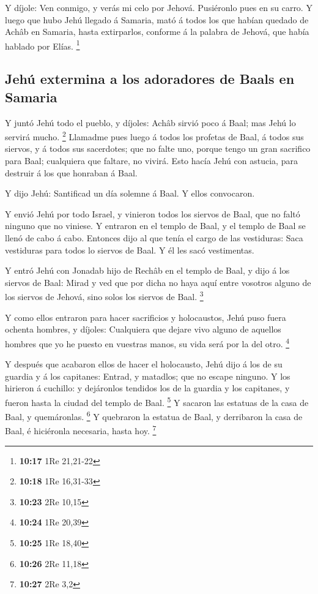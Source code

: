  Y díjole: Ven conmigo, y verás mi celo por Jehová.
Pusiéronlo pues en su carro.  Y luego que hubo Jehú llegado
á Samaria, mató á todos los que habían quedado de Achâb en Samaria,
hasta extirparlos, conforme á la palabra de Jehová, que había hablado
por Elías. \footnote{\textbf{10:17} 1Re 21,21-22}

\hypertarget{jehuxfa-extermina-a-los-adoradores-de-baals-en-samaria}{%
\subsection{Jehú extermina a los adoradores de Baals en
Samaria}\label{jehuxfa-extermina-a-los-adoradores-de-baals-en-samaria}}

 Y juntó Jehú todo el pueblo, y díjoles: Achâb sirvió poco
á Baal; mas Jehú lo servirá mucho. \footnote{\textbf{10:18} 1Re 16,31-33}
 Llamadme pues luego á todos los profetas de Baal, á todos
sus siervos, y á todos sus sacerdotes; que no falte uno, porque tengo un
gran sacrifico para Baal; cualquiera que faltare, no vivirá. Esto hacía
Jehú con astucia, para destruir á los que honraban á Baal.

 Y dijo Jehú: Santificad un día solemne á Baal. Y ellos
convocaron.

 Y envió Jehú por todo Israel, y vinieron todos los siervos
de Baal, que no faltó ninguno que no viniese. Y entraron en el templo de
Baal, y el templo de Baal se llenó de cabo á cabo. 
Entonces dijo al que tenía el cargo de las vestiduras: Saca vestiduras
para todos lo siervos de Baal. Y él les sacó vestimentas.

 Y entró Jehú con Jonadab hijo de Rechâb en el templo de
Baal, y dijo á los siervos de Baal: Mirad y ved que por dicha no haya
aquí entre vosotros alguno de los siervos de Jehová, sino solos los
siervos de Baal. \footnote{\textbf{10:23} 2Re 10,15}

 Y como ellos entraron para hacer sacrificios y
holocaustos, Jehú puso fuera ochenta hombres, y díjoles: Cualquiera que
dejare vivo alguno de aquellos hombres que yo he puesto en vuestras
manos, su vida será por la del otro. \footnote{\textbf{10:24} 1Re 20,39}

 Y después que acabaron ellos de hacer el holocausto, Jehú
dijo á los de su guardia y á los capitanes: Entrad, y matadlos; que no
escape ninguno. Y los hirieron á cuchillo: y dejáronlos tendidos los de
la guardia y los capitanes, y fueron hasta la ciudad del templo de Baal.
\footnote{\textbf{10:25} 1Re 18,40}  Y sacaron las estatuas
de la casa de Baal, y quemáronlas. \footnote{\textbf{10:26} 2Re 11,18}
 Y quebraron la estatua de Baal, y derribaron la casa de
Baal, é hiciéronla necesaria, hasta hoy. \footnote{\textbf{10:27} 2Re
  3,2}

